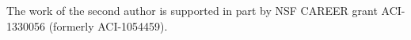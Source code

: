The work of the second author is supported in part by NSF CAREER grant 
ACI-1330056 (formerly ACI-1054459).
